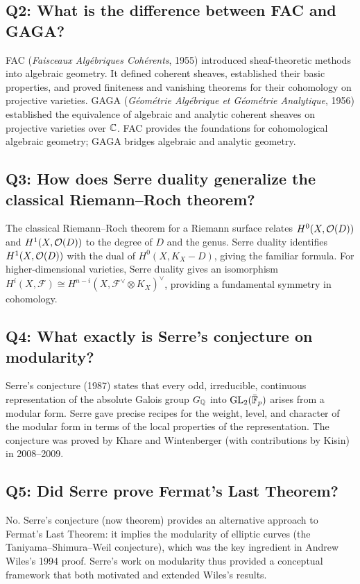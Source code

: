 \subsection*{Q2: What is the difference between FAC and GAGA?}
FAC (\textit{Faisceaux Alg\'ebriques Coh\'erents}, 1955) introduced sheaf-theoretic methods into algebraic geometry. It defined coherent sheaves, established their basic properties, and proved finiteness and vanishing theorems for their cohomology on projective varieties. GAGA (\textit{G\'eom\'etrie Alg\'ebrique et G\'eom\'etrie Analytique}, 1956) established the equivalence of algebraic and analytic coherent sheaves on projective varieties over \(\mathbb{C}\). FAC provides the foundations for cohomological algebraic geometry; GAGA bridges algebraic and analytic geometry.

\subsection*{Q3: How does Serre duality generalize the classical Riemann--Roch theorem?}
The classical Riemann--Roch theorem for a Riemann surface relates \(H^0(X, \mathcal{O}(D))\) and \(H^1(X, \mathcal{O}(D))\) to the degree of \(D\) and the genus. Serre duality identifies \(H^1(X, \mathcal{O}(D))\) with the dual of \(H^0(X, K_X - D)\), giving the familiar formula. For higher-dimensional varieties, Serre duality gives an isomorphism \(H^i(X, \mathcal{F}) \cong H^{n-i}(X, \mathcal{F}^\vee \otimes K_X)^\vee\), providing a fundamental symmetry in cohomology.

\subsection*{Q4: What exactly is Serre's conjecture on modularity?}
Serre's conjecture (1987) states that every odd, irreducible, continuous representation of the absolute Galois group \(G_{\mathbb{Q}}\) into \(\operatorname{GL}_2(\bar{\mathbb{F}}_p)\) arises from a modular form. Serre gave precise recipes for the weight, level, and character of the modular form in terms of the local properties of the representation. The conjecture was proved by Khare and Wintenberger (with contributions by Kisin) in 2008--2009.

\subsection*{Q5: Did Serre prove Fermat's Last Theorem?}
No. Serre's conjecture (now theorem) provides an alternative approach to Fermat's Last Theorem: it implies the modularity of elliptic curves (the Taniyama--Shimura--Weil conjecture), which was the key ingredient in Andrew Wiles's 1994 proof. Serre's work on modularity thus provided a conceptual framework that both motivated and extended Wiles's results.

